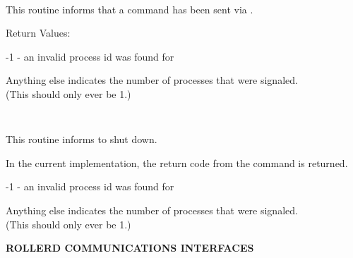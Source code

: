 \begin{description}
\item {}\verb" "

This routine informs  that a command has been sent via
.

Return Values:

\begin{description}
\item -1 - an invalid process id was found for 
\item Anything else indicates the number of processes that were signaled.\\
(This should only ever be 1.)
\end{description}

\item {}\verb" "

This routine informs  to shut down.

In the current implementation, the return code from the  command
is returned.

\begin{description}
\item -1 - an invalid process id was found for 
\item Anything else indicates the number of processes that were signaled.\\
(This should only ever be 1.)
\end{description}

\end{description}

{\bf ROLLERD COMMUNICATIONS INTERFACES}

